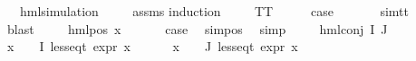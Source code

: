 \begin{isabellebody}
\ \ \ {\isachardoublequoteopen}{\isacharparenleft}{\kern0pt}hml{\isacharunderscore}{\kern0pt}simulation\ {\isasymphi}{\isacharparenright}{\kern0pt}{\isachardoublequoteclose}\isanewline
%
\isadelimproof
\ \ %
\endisadelimproof
%
\isatagproof
{}\isamarkupfalse%
\ assms\isanewline
{}\isamarkupfalse%
{\isacharparenleft}{\kern0pt}induction\ {\isasymphi}{\isacharparenright}{\kern0pt}\isanewline
\ \ \isamarkupfalse%
\ TT\isanewline
\ \ \isamarkupfalse%
\ \isamarkupfalse%
\ {\isacharquery}{\kern0pt}case\ \isanewline
\ \ \ \ \isamarkupfalse%
\ sim{\isacharunderscore}{\kern0pt}tt\ \isamarkupfalse%
\ blast\ \isanewline
{}\isamarkupfalse%
\isanewline
\ \ \isamarkupfalse%
\ {\isacharparenleft}{\kern0pt}hml{\isacharunderscore}{\kern0pt}pos\ x{}\ {\isasymphi}{\isacharparenright}{\kern0pt}\isanewline
\ \ \isamarkupfalse%
\ \isamarkupfalse%
\ {\isacharquery}{\kern0pt}case\ \isamarkupfalse%
\ sim{\isacharunderscore}{\kern0pt}pos\ \isamarkupfalse%
\ simp\ \isanewline
{}\isamarkupfalse%
\isanewline
\ \ \isamarkupfalse%
\ {\isacharparenleft}{\kern0pt}hml{\isacharunderscore}{\kern0pt}conj\ I\ J\ {\isasymPhi}{\isacharparenright}{\kern0pt}\isanewline
\ \ \isamarkupfalse%
\ {\isachardoublequoteopen}{\isasymforall}x\ {\isasymin}\ {\isacharparenleft}{\kern0pt}{\isasymPhi}\ {\isacharbackquote}{\kern0pt}\ I{\isacharparenright}{\kern0pt}{\isachardot}{\kern0pt}\ less{\isacharunderscore}{\kern0pt}eq{\isacharunderscore}{\kern0pt}t\ {\isacharparenleft}{\kern0pt}expr\ x{\isacharparenright}{\kern0pt}\ {\isacharparenleft}{\kern0pt}{\isasyminfinity}{\isacharcomma}{\kern0pt}\ {\isasyminfinity}{\isacharcomma}{\kern0pt}\ {\isasyminfinity}{\isacharcomma}{\kern0pt}\ {\isasyminfinity}{\isacharcomma}{\kern0pt}\ {}{\isacharcomma}{\kern0pt}\ {}{\isacharparenright}{\kern0pt}{\isachardoublequoteclose}\isanewline
{\isachardoublequoteopen}{\isasymforall}x\ {\isasymin}\ {\isacharparenleft}{\kern0pt}{\isasymPhi}\ {\isacharbackquote}{\kern0pt}\ J{\isacharparenright}{\kern0pt}{\isachardot}{\kern0pt}\ less{\isacharunderscore}{\kern0pt}eq{\isacharunderscore}{\kern0pt}t\ {\isacharparenleft}{\kern0pt}expr\ x{\isacharparenright}{\kern0pt}\ {\isacharparenleft}{\kern0pt}{\isasyminfinity}{\isacharcomma}{\kern0pt}\ {\isasyminfinity}{\isacharcomma}{\kern0pt}\ {\isasyminfinity}{\isacharcomma}{\kern0pt}\ {\isasyminfinity}{\isacharcomma}{\kern0pt}\ {}{\isacharcomma}{\kern0pt}\ {}{\isacharparenright}{\kern0pt}{\isachardoublequoteclose}\isanewline

\end{isabellebody}

